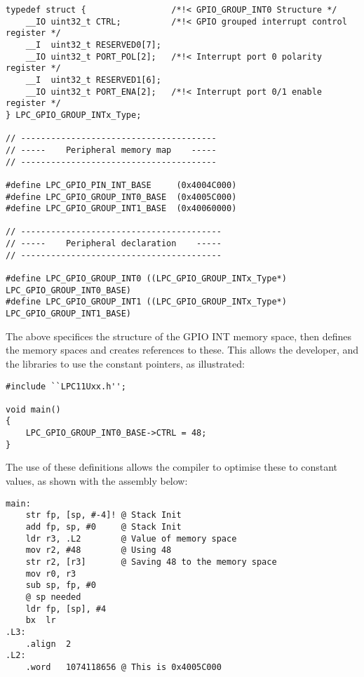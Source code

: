 \begin{lstlisting}[caption={Memory spaces mapped in LPC11Uxx.h}]
typedef struct {                 /*!< GPIO_GROUP_INT0 Structure */
    __IO uint32_t CTRL;          /*!< GPIO grouped interrupt control register */
    __I  uint32_t RESERVED0[7];
    __IO uint32_t PORT_POL[2];   /*!< Interrupt port 0 polarity register */
    __I  uint32_t RESERVED1[6];
    __IO uint32_t PORT_ENA[2];   /*!< Interrupt port 0/1 enable register */
} LPC_GPIO_GROUP_INTx_Type;

// ---------------------------------------
// -----    Peripheral memory map    -----
// ---------------------------------------

#define LPC_GPIO_PIN_INT_BASE     (0x4004C000)
#define LPC_GPIO_GROUP_INT0_BASE  (0x4005C000)
#define LPC_GPIO_GROUP_INT1_BASE  (0x40060000)

// ----------------------------------------
// -----    Peripheral declaration    -----
// ----------------------------------------

#define LPC_GPIO_GROUP_INT0 ((LPC_GPIO_GROUP_INTx_Type*) LPC_GPIO_GROUP_INT0_BASE)
#define LPC_GPIO_GROUP_INT1 ((LPC_GPIO_GROUP_INTx_Type*) LPC_GPIO_GROUP_INT1_BASE)
\end{lstlisting}

The above specifices the structure of the GPIO INT memory space, then defines the memory spaces and creates references to these. This allows the developer, and the libraries to use the constant pointers, as illustrated:

\begin{lstlisting}[caption={LPC GPIO GROUP INT0 being used}]
#include ``LPC11Uxx.h'';

void main()
{
    LPC_GPIO_GROUP_INT0_BASE->CTRL = 48;
}
\end{lstlisting}

The use of these definitions allows the compiler to optimise these to constant values, as shown with the assembly below:

\begin{lstlisting}[caption={LPC GPIO GROUP INT0 converted to ASM}]
main:
    str fp, [sp, #-4]! @ Stack Init
    add fp, sp, #0     @ Stack Init
    ldr r3, .L2        @ Value of memory space
    mov r2, #48        @ Using 48
    str r2, [r3]       @ Saving 48 to the memory space
    mov r0, r3
    sub sp, fp, #0
    @ sp needed
    ldr fp, [sp], #4
    bx  lr
.L3:
    .align  2
.L2:
    .word   1074118656 @ This is 0x4005C000
\end{lstlisting}

